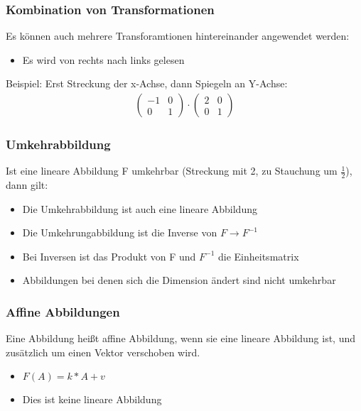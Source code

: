 \begin{frame}
	\frametitle{Kombination von Transformationen}
	Es können auch mehrere Transforamtionen hintereinander angewendet werden:
	\begin{itemize}
		\item Es wird von rechts nach links gelesen
	\end{itemize}
	Beispiel:
	Erst Streckung der x-Achse, dann Spiegeln an Y-Achse:
	\begin{gather*}
	\begin{pmatrix}
		-1 & 0 \\
		0 & 1
	\end{pmatrix} \cdot
	\begin{pmatrix}
		2 & 0 \\
		0 & 1
	\end{pmatrix} \end{gather*}
\end{frame}

\begin{frame}
	\frametitle{Umkehrabbildung}
	Ist eine lineare Abbildung F umkehrbar (Streckung mit 2, zu Stauchung um $\frac{1}{2}$), dann gilt:
	\begin{itemize}
		\item Die Umkehrabbildung ist auch eine lineare Abbildung
		\item Die Umkehrungabbildung ist die Inverse von $F \rightarrow F^{-1}$
		\item Bei Inversen ist das Produkt von F und $F^{-1}$ die Einheitsmatrix
		\item Abbildungen bei denen sich die Dimension ändert sind nicht umkehrbar
	\end{itemize}
\end{frame}

\begin{frame}
	\frametitle{Affine Abbildungen}
	Eine Abbildung heißt affine Abbildung, wenn sie eine lineare Abbildung ist, und zusätzlich um einen Vektor verschoben wird.
	\begin{itemize}
		\item $F(A) = k*A + v$
		\item Dies ist keine lineare Abbildung
	\end{itemize}
\end{frame}

